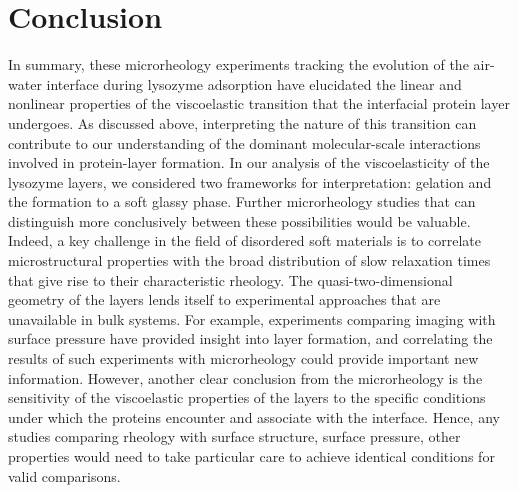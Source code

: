 \section{\label{sec:conclusion}Conclusion}

In summary, these microrheology experiments tracking the evolution of the air-water interface during lysozyme adsorption have elucidated the linear and nonlinear properties of the viscoelastic transition that the interfacial protein layer undergoes.  As discussed above, interpreting the nature of this transition can contribute to our understanding of the dominant molecular-scale interactions involved in protein-layer formation.  In our analysis of the viscoelasticity of the lysozyme layers, we considered two frameworks for interpretation:  gelation and the formation to a soft glassy phase.  Further microrheology studies that can distinguish more conclusively between these possibilities would be valuable.   Indeed, a key challenge in the field of disordered soft materials is to correlate microstructural properties with the broad distribution of slow relaxation times that give rise to their characteristic rheology.  The quasi-two-dimensional geometry of the layers lends itself to experimental approaches that are unavailable in bulk systems.  For example, experiments comparing imaging with surface pressure have provided insight into layer formation,\cite{Erickson2000} and correlating the results of such experiments with microrheology could provide important new information.  However, another clear conclusion from the microrheology is the sensitivity of the viscoelastic properties of the layers to the specific conditions under which the proteins encounter and associate with the interface.  Hence, any studies comparing rheology with surface structure, surface pressure, other properties would need to take particular care to achieve identical conditions for valid comparisons.




